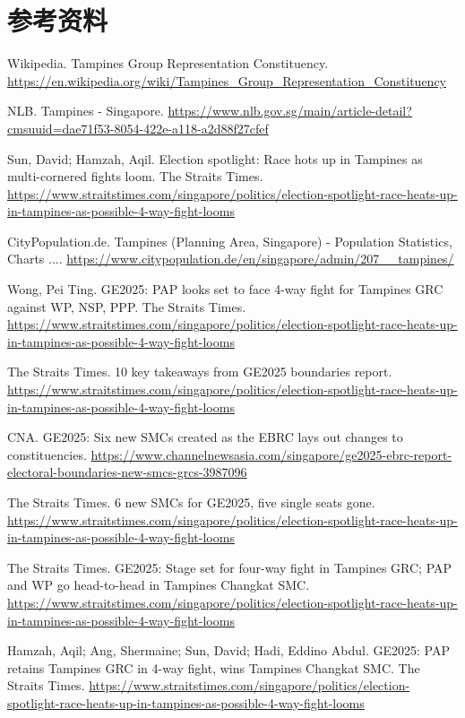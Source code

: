 \documentclass[11pt,a4paper,twoside,openany]{book}
\begin{document}
\section*{参考资料}
\begin{enumerate}[label={[\arabic*]},leftmargin=*,topsep=2pt,itemsep=1pt,parsep=0pt]
  \item Wikipedia. Tampines Group Representation Constituency. \url{https://en.wikipedia.org/wiki/Tampines_Group_Representation_Constituency}
  \item NLB. Tampines - Singapore. \url{https://www.nlb.gov.sg/main/article-detail?cmsuuid=dae71f53-8054-422e-a118-a2d88f27cfef}
  \item Sun, David; Hamzah, Aqil. Election spotlight: Race hots up in Tampines as multi-cornered fights loom. The Straits Times. \url{https://www.straitstimes.com/singapore/politics/election-spotlight-race-heats-up-in-tampines-as-possible-4-way-fight-looms}
  \item CityPopulation.de. Tampines (Planning Area, Singapore) - Population Statistics, Charts .... \url{https://www.citypopulation.de/en/singapore/admin/207__tampines/}
  \item Wong, Pei Ting. GE2025: PAP looks set to face 4-way fight for Tampines GRC against WP, NSP, PPP. The Straits Times. \url{https://www.straitstimes.com/singapore/politics/election-spotlight-race-heats-up-in-tampines-as-possible-4-way-fight-looms}
  \item The Straits Times. 10 key takeaways from GE2025 boundaries report. \url{https://www.straitstimes.com/singapore/politics/election-spotlight-race-heats-up-in-tampines-as-possible-4-way-fight-looms}
  \item CNA. GE2025: Six new SMCs created as the EBRC lays out changes to constituencies. \url{https://www.channelnewsasia.com/singapore/ge2025-ebrc-report-electoral-boundaries-new-smcs-grcs-3987096}
  \item The Straits Times. 6 new SMCs for GE2025, five single seats gone. \url{https://www.straitstimes.com/singapore/politics/election-spotlight-race-heats-up-in-tampines-as-possible-4-way-fight-looms}
  \item The Straits Times. GE2025: Stage set for four-way fight in Tampines GRC; PAP and WP go head-to-head in Tampines Changkat SMC. \url{https://www.straitstimes.com/singapore/politics/election-spotlight-race-heats-up-in-tampines-as-possible-4-way-fight-looms}
  \item Hamzah, Aqil; Ang, Shermaine; Sun, David; Hadi, Eddino Abdul. GE2025: PAP retains Tampines GRC in 4-way fight, wins Tampines Changkat SMC. The Straits Times. \url{https://www.straitstimes.com/singapore/politics/election-spotlight-race-heats-up-in-tampines-as-possible-4-way-fight-looms}

\end{enumerate}
\end{document}
